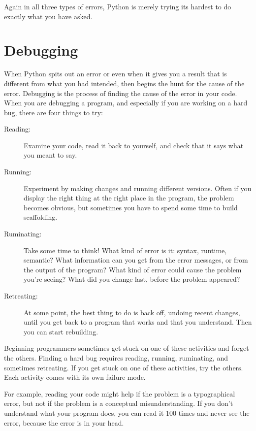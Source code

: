 Again in all three types of errors, Python is merely trying its hardest to 
do exactly what you have asked.

\section{Debugging}
When Python spits out an error or even when it gives you a result that is different from what you had intended, then begins the hunt for the cause of the error. Debugging is the process of finding the cause of the error in your code. When you are debugging a program, and especially if you are working on a hard bug, there are four things to try:

\begin{description}

\item[Reading:] Examine your code, read it back to yourself, and check that it says what you meant to say.

\item[Running:] Experiment by making changes and running different versions. Often if you display the right thing at the right place in the program, the problem becomes obvious, but sometimes you have to spend some time to build scaffolding.

\item[Ruminating:] Take some time to think! What kind of error is it: syntax, runtime, semantic? What information can you get from the error messages, or from the output of the program? What kind of error could cause the problem you're seeing? What did you change last, before the problem appeared?

\item[Retreating:] At some point, the best thing to do is back off, undoing recent changes, until you get back to a program that works and that you understand. Then you can start rebuilding.

\end{description}

Beginning programmers sometimes get stuck on one of these activities and forget the others.  Finding a hard bug requires reading, running, ruminating, and sometimes retreating. If you get stuck on one of these activities, try the others. Each activity comes with its own failure mode.


For example, reading your code might help if the problem is a
typographical error, but not if the problem is a conceptual
misunderstanding. If you don't understand what your program does, you
can read it 100 times and never see the error, because the error is in
your head.

